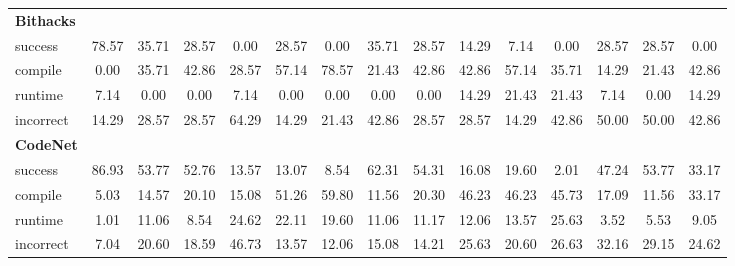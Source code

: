 \begin{table}[t]
\begin{tabular}{@{}lcccccccccccccc@{}}
\textbf{Bithacks} & & & & & & & & & & & & & & \\ 
\quad success & 78.57 & 35.71 & 28.57 & 0.00 & 28.57 & 0.00 & 35.71 & 28.57 & 14.29 & 7.14 & 0.00 & 28.57 & 28.57 & 0.00 \\
\qquad compile & 0.00 & 35.71 & 42.86 & 28.57 & 57.14 & 78.57 & 21.43 & 42.86 & 42.86 & 57.14 & 35.71 & 14.29 & 21.43 & 42.86 \\
\qquad runtime & 7.14 & 0.00 & 0.00 & 7.14 & 0.00 & 0.00 & 0.00 & 0.00 & 14.29 & 21.43 & 21.43 & 7.14 & 0.00 & 14.29 \\
\qquad incorrect & 14.29 & 28.57 & 28.57 & 64.29 & 14.29 & 21.43 & 42.86 & 28.57 & 28.57 & 14.29 & 42.86 & 50.00 & 50.00 & 42.86 \\
 

\textbf{CodeNet} & & & & & & & & & & & & & & \\ 
\quad success & 86.93 & 53.77 & 52.76 & 13.57 & 13.07 & 8.54 & 62.31 & 54.31 & 16.08 & 19.60 & 2.01 & 47.24 & 53.77 & 33.17 \\
\qquad compile & 5.03 & 14.57 & 20.10 & 15.08 & 51.26 & 59.80 & 11.56 & 20.30 & 46.23 & 46.23 & 45.73 & 17.09 & 11.56 & 33.17 \\
\qquad runtime & 1.01 & 11.06 & 8.54 & 24.62 & 22.11 & 19.60 & 11.06 & 11.17 & 12.06 & 13.57 & 25.63 & 3.52 & 5.53 & 9.05 \\
\qquad incorrect & 7.04 & 20.60 & 18.59 & 46.73 & 13.57 & 12.06 & 15.08 & 14.21 & 25.63 & 20.60 & 26.63 & 32.16 & 29.15 & 24.62 \\
 

\bottomrule
\end{tabular}
\end{table}




